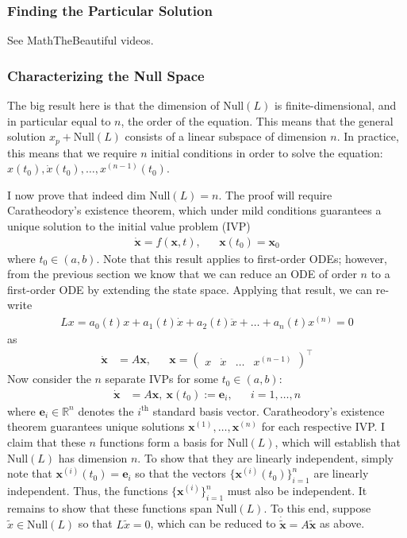 \documentclass[12pt]{article}
\newcommand{\R}{\mathbb{R}}
\newcommand{\bx}{\mathbf{x}}
\newcommand{\be}{\mathbf{e}}
\begin{document}
\subsubsection{Finding the Particular Solution}
See MathTheBeautiful videos. 

\subsubsection{Characterizing the Null Space}
The big result here is that the dimension of $\text{Null}(L)$ is finite-dimensional, and in particular equal to $n$, the order of the equation. This means that the general solution 
$x_p + \text{Null}(L)$ consists of a linear subspace of dimension $n$. In practice, this means that we require $n$ initial conditions in order to solve the equation: 
$x(t_0), \dot{x}(t_0), \dots, x^{(n-1)}(t_0)$. 

I now prove that indeed $\text{dim } \text{Null}(L) = n$. The proof will require Caratheodory's existence theorem, which under mild conditions guarantees a unique solution to the initial value problem (IVP) 
\begin{align*}
\dot{\bx} = f(\bx, t), && \bx(t_0) = \bx_0
\end{align*}
where $t_0 \in (a, b)$. Note that this result applies to first-order ODEs; however, from the previous section we know that we can reduce an ODE of order $n$ to a first-order ODE 
by extending the state space. Applying that result, we can re-write 
\begin{align*}
Lx = a_0(t)x + a_1(t) \dot{x} + a_2(t) \ddot{x} + \dots + a_n(t) x^{(n)} = 0
\end{align*}
as 
\begin{align*}
\dot{\bx} &= A\bx, &&\bx = \begin{pmatrix} x & \dot{x} & \hdots & x^{(n-1)} \end{pmatrix}^\top
\end{align*}
Now consider the $n$ separate IVPs for some $t_0 \in (a, b)$:
\begin{align*}
\dot{\bx} &= A\bx, \ \bx(t_0) := \be_i, &&i = 1, \dots, n
\end{align*}
where $\be_i \in \R^n$ denotes the $i^{\text{th}}$ standard basis vector. Caratheodory's existence theorem guarantees unique solutions 
$\bx^{(1)}, \dots, \bx^{(n)}$ for each respective IVP. I claim that these $n$ functions form a basis for $\text{Null}(L)$, which will establish that $\text{Null}(L)$ has dimension $n$.
To show that they are linearly independent, simply note that $\bx^{(i)}(t_0) = \be_i$ so that the vectors $\{\bx^{(i)}(t_0)\}_{i = 1}^{n}$ are linearly independent. Thus, the functions 
 $\{\bx^{(i)}\}_{i = 1}^{n}$ must also be independent. It remains to show that these functions span $\text{Null}(L)$. To this end, suppose $\tilde{x} \in \text{Null}(L)$ so that $L\tilde{x} = 0$, 
 which can be reduced to $\dot{\tilde{\bx}} = A\tilde{\bx}$ as above. 
 
\end{document}
